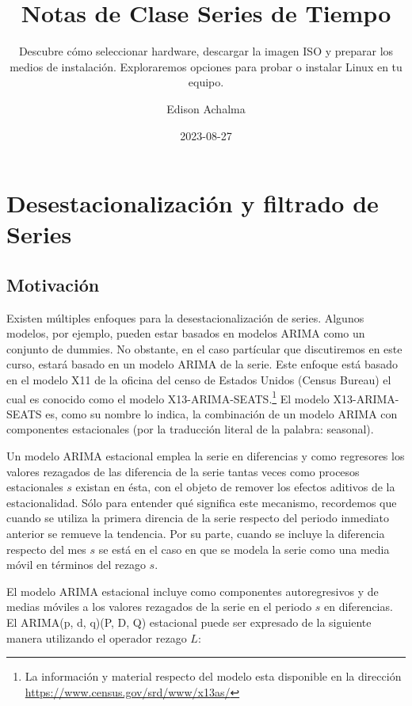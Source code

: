 \documentclass[
  a4paper,
]{article}
\title{Notas de Clase Series de Tiempo}
\subtitle{Descubre cómo seleccionar hardware, descargar la imagen ISO y
preparar los medios de instalación. Exploraremos opciones para probar o
instalar Linux en tu equipo.}
\author{Edison Achalma}
\date{2023-08-27}
\begin{document}
\maketitle
\ifdefined\Shaded\renewenvironment{Shaded}{\begin{tcolorbox}[interior hidden, borderline west={3pt}{0pt}{shadecolor}, enhanced, breakable, frame hidden, sharp corners, boxrule=0pt]}{\end{tcolorbox}}\fi

\hypertarget{desestacionalizaciuxf3n-y-filtrado-de-series}{%
\section{Desestacionalización y filtrado de
Series}\label{desestacionalizaciuxf3n-y-filtrado-de-series}}

\hypertarget{motivaciuxf3n}{%
\subsection{Motivación}\label{motivaciuxf3n}}

Existen múltiples enfoques para la desestacionalización de series.
Algunos modelos, por ejemplo, pueden estar basados en modelos ARIMA como
un conjunto de dummies. No obstante, en el caso partícular que
discutiremos en este curso, estará basado en un modelo ARIMA de la
serie. Este enfoque está basado en el modelo X11 de la oficina del censo
de Estados Unidos (Census Bureau) el cual es conocido como el modelo
X13-ARIMA-SEATS.\footnote{ La información y material respecto del modelo esta disponible en la dirección \url{https://www.census.gov/srd/www/x13as/}}
El modelo X13-ARIMA-SEATS es, como su nombre lo indica, la combinación
de un modelo ARIMA con componentes estacionales (por la traducción
literal de la palabra: seasonal).

Un modelo ARIMA estacional emplea la serie en diferencias y como
regresores los valores rezagados de las diferencia de la serie tantas
veces como procesos estacionales \(s\) existan en ésta, con el objeto de
remover los efectos aditivos de la estacionalidad. Sólo para entender
qué significa este mecanismo, recordemos que cuando se utiliza la
primera direncia de la serie respecto del periodo inmediato anterior se
remueve la tendencia. Por su parte, cuando se incluye la diferencia
respecto del mes \(s\) se está en el caso en que se modela la serie como
una media móvil en términos del rezago \(s\).

El modelo ARIMA estacional incluye como componentes autoregresivos y de
medias móviles a los valores rezagados de la serie en el periodo \(s\)
en diferencias. El ARIMA(p, d, q)(P, D, Q) estacional puede ser
expresado de la siguiente manera utilizando el operador rezago \(L\):
\end{document}
